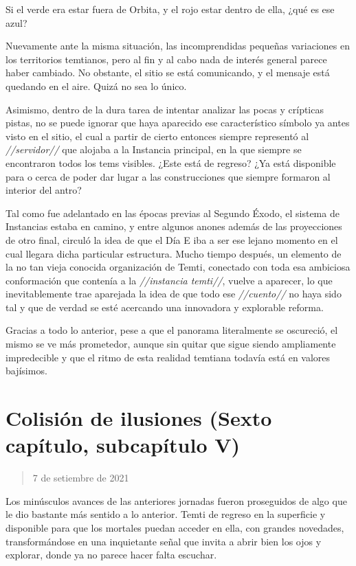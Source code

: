 \documentclass[
  spanish,
]{book}
\begin{document}
Si el verde era estar fuera de Orbita, y el rojo estar dentro de ella, ¿qué es ese azul?

Nuevamente ante la misma situación, las incomprendidas pequeñas variaciones en los territorios temtianos, pero al fin y al cabo nada de interés general parece haber cambiado. No obstante, el sitio se está comunicando, y el mensaje está quedando en el aire. Quizá no sea lo único.

Asimismo, dentro de la dura tarea de intentar analizar las pocas y crípticas pistas, no se puede ignorar que haya aparecido ese característico símbolo ya antes visto en el sitio, el cual a partir de cierto entonces siempre representó al \emph{//servidor//} que alojaba a la Instancia principal, en la que siempre se encontraron todos los tems visibles. ¿Este está de regreso? ¿Ya está disponible para o cerca de poder dar lugar a las construcciones que siempre formaron al interior del antro?

Tal como fue adelantado en las épocas previas al Segundo Éxodo, el sistema de Instancias estaba en camino, y entre algunos anones además de las proyecciones de otro final, circuló la idea de que el Día E iba a ser ese lejano momento en el cual llegara dicha particular estructura.
Mucho tiempo después, un elemento de la no tan vieja conocida organización de Temti, conectado con toda esa ambiciosa conformación que contenía a la \emph{//instancia temti//}, vuelve a aparecer, lo que inevitablemente trae aparejada la idea de que todo ese \emph{//cuento//} no haya sido tal y que de verdad se esté acercando una innovadora y explorable reforma.

Gracias a todo lo anterior, pese a que el panorama literalmente se oscureció, el mismo se ve más prometedor, aunque sin quitar que sigue siendo ampliamente impredecible y que el ritmo de esta realidad temtiana todavía está en valores bajísimos.

\hypertarget{colisiuxf3n-de-ilusiones-sexto-capuxedtulo-subcapuxedtulo-v}{%
\section{Colisión de ilusiones (Sexto capítulo, subcapítulo V)}\label{colisiuxf3n-de-ilusiones-sexto-capuxedtulo-subcapuxedtulo-v}}

\begin{quote}
7 de setiembre de 2021
\end{quote}

Los minúsculos avances de las anteriores jornadas fueron proseguidos de algo que le dio bastante más sentido a lo anterior. Temti de regreso en la superficie y disponible para que los mortales puedan acceder en ella, con grandes novedades, transformándose en una inquietante señal que invita a abrir bien los ojos y explorar, donde ya no parece hacer falta escuchar.
\end{document}

